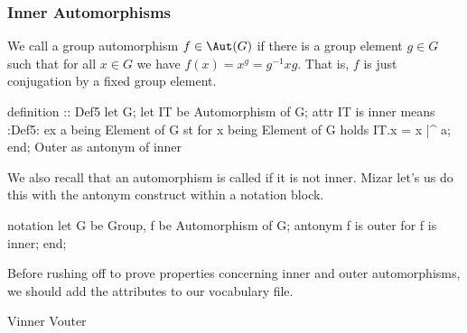 \nwendcode{}\nwdocspar

\subsubsection{Inner Automorphisms}

We call a group automorphism $f\in\Aut(G)$  if there is a
group element $g\in G$ such that for all $x\in G$ we have $f(x) = x^{g} = g^{-1}xg$.
That is, $f$ is just conjugation by a fixed group element.

\nwenddocs{}\endmoddef\nwstartdeflinemarkup{}\nwenddeflinemarkup
definition :: Def5
  let G;
  let IT be Automorphism of G;
  attr IT is inner means
  :Def5:
  ex a being Element of G st
  for x being Element of G holds IT.x = x |^ a;
end;
\LA{}Outer as antonym of inner~{\nwtagstyle{}}\RA{}

\nwendcode{}\nwdocspar

\M We also recall that an automorphism is called  if it is
not inner. Mizar let's us do this with the {\Tt{}antonym\nwendquote} construct within
a {\Tt{}notation\nwendquote} block.

\nwenddocs{}\endmoddef\nwstartdeflinemarkup{}\nwenddeflinemarkup
notation
  let G be Group, f be Automorphism of G;
  antonym f is outer for f is inner;
end;

\nwendcode{}\nwdocspar

Before rushing off to prove properties concerning inner and outer
automorphisms, we should add the attributes to our vocabulary file.


\nwenddocs{}\plusendmoddef\nwstartdeflinemarkup{}\nwenddeflinemarkup
Vinner
Vouter

